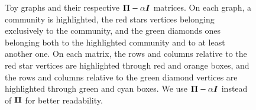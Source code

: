 \begin{figure}[t]
    \hfill
    \hfill
    \caption{Toy graphs and their respective $\mat{\Pi} - \alpha \identity{n}$ matrices. On each graph, a community is highlighted, the red stars vertices belonging exclusively to the community, and the green diamonds ones belonging both to the highlighted community and to at least another one. On each matrix, the rows and columns relative to the red star vertices are highlighted through red and orange boxes, and the rows and columns relative to the green diamond vertices are highlighted through green and cyan boxes.  We use $\mat{\Pi} - \alpha \identity{n}$ instead of $\mat{\Pi}$ for better readability.}
    \label{fig:graphs_PPR}
\end{figure}

